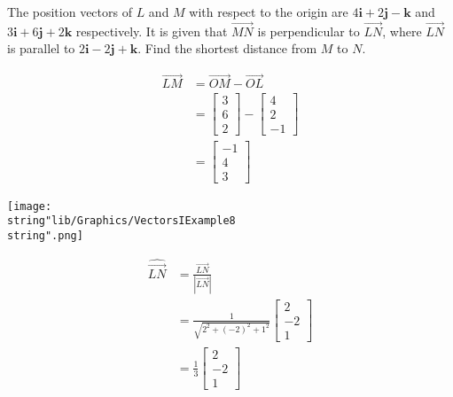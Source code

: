 \documentclass[11pt,a4paper]{book}
\begin{document}
\begin{example}

The position vectors of $L$ and $M$ with respect to the origin are
$4\textbf{i}+2\textbf{j}-\textbf{k}$ and $3\textbf{i}+6\textbf{j}+2\textbf{k}$
respectively. It is given that $\overrightarrow{MN}$ is perpendicular
to $\overrightarrow{LN}$, where $\overrightarrow{LN}$ is parallel
to $2\textbf{i}-2\textbf{j}+\textbf{k}$. Find the shortest distance
from $M$ to $N$.

\Solution

\begin{minipage}[t]{1\textwidth}

\begin{align*}
\overrightarrow{LM} & =\overrightarrow{OM}-\overrightarrow{OL}\\
 & =\begin{bmatrix}3\\
6\\
2
\end{bmatrix}-\begin{bmatrix}4\\
2\\
-1
\end{bmatrix}\\
 & =\begin{bmatrix}-1\\
4\\
3
\end{bmatrix}
\end{align*}

\end{minipage}
\begin{minipage}[t]{0.2\textwidth}
\begin{center}
\texttt{[image: \\string"lib/Graphics/VectorsIExample8\\string".png]}
\par\end{center}

\end{minipage}

\begin{align*}
\widehat{\overrightarrow{LN}} & =\frac{\overrightarrow{LN}}{\left|\overrightarrow{LN}\right|}\\
 & =\frac{1}{\sqrt{2^{2}+\left(-2\right)^{2}+1^{2}}}\begin{bmatrix}2\\
-2\\
1
\end{bmatrix}\\
 & =\frac{1}{3}\begin{bmatrix}2\\
-2\\
1
\end{bmatrix}
\end{align*}


\end{example}
\end{document}
